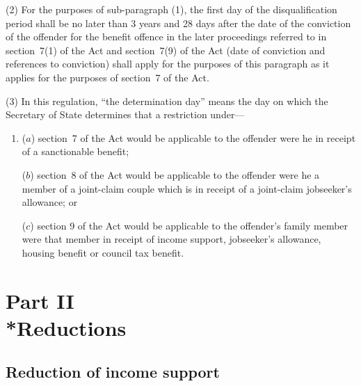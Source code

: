 \documentclass[12pt,a4paper]{article}
\begin{document}
(2) For the purposes of sub-paragraph (1), the first day of the disqualification period shall be no later than 3 years and 28 days after the date of the conviction of the offender for the benefit offence in the later proceedings referred to in section~7(1) of the Act and section~7(9) of the Act (date of conviction and references to conviction) shall apply for the purposes of this paragraph as it applies for the purposes of section~7 of the Act.

(3) In this regulation, “the determination day” means the day on which the Secretary of State determines that a restriction under—
\begin{enumerate}\item[]
($a$) section~7 of the Act would be applicable to the offender were he in receipt of a sanctionable benefit;

($b$) section~8 of the Act would be applicable to the offender were he a member of a joint-claim couple which is in receipt of a joint-claim jobseeker’s allowance; or

($c$) section 9 of the Act would be applicable to the offender’s family member were that member in receipt of income support, jobseeker’s allowance, housing benefit or council tax benefit.
\end{enumerate}

\section[Part II --- Reductions]{Part II\\*Reductions}

\renewcommand\parthead{--- Part II}

\subsection[3. Reduction of income support]{Reduction of income support}
\end{document}
